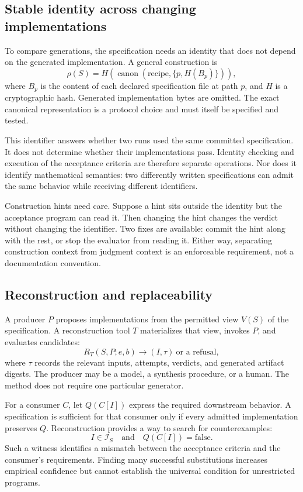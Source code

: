 \documentclass[10pt,twocolumn,letterpaper]{article}
\begin{document}
\subsection{Stable identity across changing implementations}
To compare generations, the specification needs an identity that does not depend on the generated implementation. A general construction is
\begin{equation}
 \rho(S)=H\!\left(\operatorname{canon}(\text{recipe},\{p,H(B_p)\})\right),
\end{equation}
where $B_p$ is the content of each declared specification file at path $p$, and $H$ is a cryptographic hash. Generated implementation bytes are omitted. The exact canonical representation is a protocol choice and must itself be specified and tested.

This identifier answers whether two runs used the same committed specification. It does not determine whether their implementations pass. Identity checking and execution of the acceptance criteria are therefore separate operations. Nor does it identify mathematical semantics: two differently written specifications can admit the same behavior while receiving different identifiers.

Construction hints need care. Suppose a hint sits outside the identity but the acceptance program can read it. Then changing the hint changes the verdict without changing the identifier. Two fixes are available: commit the hint along with the rest, or stop the evaluator from reading it. Either way, separating construction context from judgment context is an enforceable requirement, not a documentation convention.

\subsection{Reconstruction and replaceability}
A producer $P$ proposes implementations from the permitted view $V(S)$ of the specification. A reconstruction tool $T$ materializes that view, invokes $P$, and evaluates candidates:
\begin{equation}
 R_T(S,P;e,b)\longrightarrow (I,\tau)\ \text{or a refusal},
\end{equation}
where $\tau$ records the relevant inputs, attempts, verdicts, and generated artifact digests. The producer may be a model, a synthesis procedure, or a human. The method does not require one particular generator.

For a consumer $C$, let $Q(C[I])$ express the required downstream behavior. A specification is sufficient for that consumer only if every admitted implementation preserves $Q$. Reconstruction provides a way to search for counterexamples:
\begin{equation}
 I\in\mathcal{I}_S\quad\text{and}\quad Q(C[I])=\mathrm{false}.
\end{equation}
Such a witness identifies a mismatch between the acceptance criteria and the consumer's requirements. Finding many successful substitutions increases empirical confidence but cannot establish the universal condition for unrestricted programs.
\end{document}
